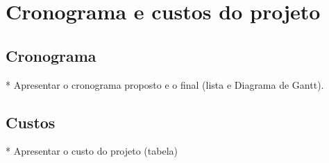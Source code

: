 \chapter{Cronograma e custos do projeto}

\section{Cronograma}

* Apresentar o cronograma proposto e o final (lista e Diagrama de Gantt). \\


\section{Custos}

* Apresentar o custo do projeto (tabela)